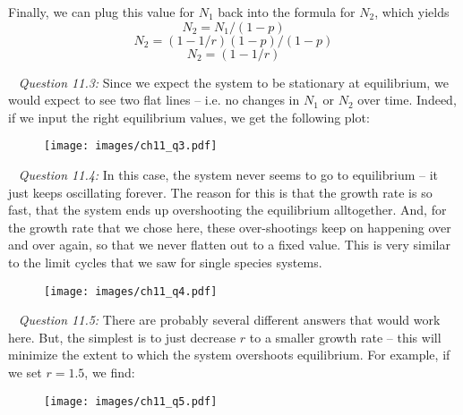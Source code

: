 \documentclass[12pt]{article}
\begin{document}
Finally, we can plug this value for $N_1$ back into the formula for $N_2$, which yields
$$ N_2 = N_1/(1 - p) $$
$$ N_2 = (1 - 1/r)(1 - p)/(1 - p) $$
$$ N_2 = (1 - 1/r) $$

~\newline
\textit{Question 11.3:}
\newline
Since we expect the system to be stationary at equilibrium, we would expect to see two flat lines -- i.e. no changes in $N_1$ or $N_2$ over time. Indeed, if we input the right equilibrium values, we get the following plot:

\begin{figure}[H]
  \centering
  \texttt{[image: images/ch11\_q3.pdf]}
\end{figure}

~\newline
\textit{Question 11.4:}
\newline
In this case, the system never seems to go to equilibrium -- it just keeps oscillating forever. The reason for this is that the growth rate is so fast, that the system ends up overshooting the equilibrium alltogether. And, for the growth rate that we chose here, these over-shootings keep on happening over and over again, so that we never flatten out to a fixed value. This is very similar to the limit cycles that we saw for single species systems.

\begin{figure}[H]
  \centering
  \texttt{[image: images/ch11\_q4.pdf]}
\end{figure}

\newpage

~\newline
\textit{Question 11.5:}
\newline
There are probably several different answers that would work here. But, the simplest is to just decrease $r$ to a smaller growth rate -- this will minimize the extent to which the system overshoots equilibrium. For example, if we set $r = 1.5$, we find:

\begin{figure}[H]
  \centering
  \texttt{[image: images/ch11\_q5.pdf]}
\end{figure}

~\newline
\end{document}
